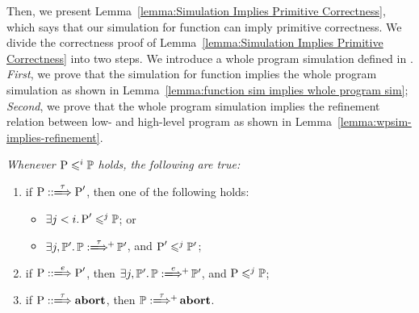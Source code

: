 Then, we present  
Lemma~\ref{lemma:Simulation Implies Primitive Correctness}, 
which says that our simulation for function can imply 
primitive correctness. We divide the correctness proof of 
Lemma~\ref{lemma:Simulation Implies Primitive Correctness}
into two steps. We introduce a whole program simulation 
defined in \Def{\ref{def:wpsim}}. \textit{First}, we prove 
that the simulation for function implies the whole program 
simulation as shown in 
Lemma~\ref{lemma:function sim implies whole program sim}; 
\textit{Second}, we prove that 
the whole program simulation implies the refinement relation 
between low- and high-level program as shown in
Lemma~\ref{lemma:wpsim-implies-refinement}. 
\begin{definition}
    \label{def:wpsim}
    \em
    Whenever $\text{P} \leqslant^{i} \mathbb{P}$ holds, 
    the following are true:
    \begin{enumerate}[1.]
        \small
        \item if $\LGlobTrans{\prog}{\tau}{\prog'}$, 
            then one of the following holds:
            \begin{itemize}
                \item $\exists j < i. \, 
                    \text{P}' \leqslant^{j} \mathbb{P}$; or 
                \item $\exists j, \HProg'. \, 
                    \HGlobMultiTrans{\HProg}{\tau}{+}{\HProg'}$, 
                    and $\text{P}' \leqslant^{j} \mathbb{P}'$;
            \end{itemize}
        \item if $\LGlobTrans{\prog}{\event}{\prog'}$, 
            then $\exists j, \HProg'. \, 
            \HGlobMultiTrans{\HProg}{\event}{+}{\HProg'}$,
            and $\text{P} \leqslant^{j} \mathbb{P}$; 
        \item if $\LGlobTrans{\prog}{\tau}{\evtabort}$, 
            then $\HGlobMultiTrans{\HProg}{\tau}{+}{\evtabort}$.
    \end{enumerate}
\end{definition}


